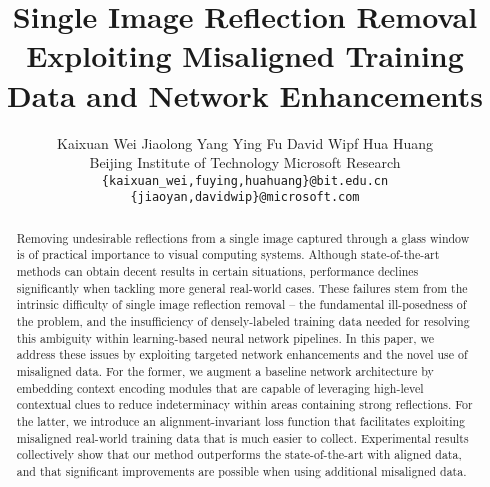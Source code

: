 \documentclass[10pt,twocolumn,letterpaper]{article}
\begin{document}
\title{Single Image Reflection Removal Exploiting Misaligned Training Data and Network Enhancements}

\author{Kaixuan Wei  \quad Jiaolong Yang \quad Ying Fu \quad David Wipf \quad Hua Huang
\\ Beijing Institute of Technology \quad Microsoft  Research\\
{\tt\small \{kaixuan\_wei,fuying,huahuang\}@bit.edu.cn} \quad
{\tt\small \{jiaoyan,davidwip\}@microsoft.com}
}



\maketitle


\begin{abstract}
Removing undesirable reflections from a single image captured through a glass window is of practical importance to visual computing systems. Although state-of-the-art methods can obtain decent results in certain situations, performance declines significantly when tackling more general real-world cases.  These failures stem from the intrinsic difficulty of single image reflection removal -- the fundamental ill-posedness of the problem, and the insufficiency of densely-labeled training data needed for resolving this ambiguity within learning-based neural network pipelines. In this paper, we address these issues by exploiting targeted network enhancements and the novel use of misaligned data. For the former, we augment a baseline network architecture by embedding context encoding modules that are capable of leveraging high-level contextual clues to reduce indeterminacy within areas containing strong reflections. For the latter, we introduce an alignment-invariant loss function that facilitates exploiting misaligned real-world training data that is much easier to collect.  Experimental results collectively show that our method outperforms the state-of-the-art with aligned data, and that significant improvements are possible when using additional misaligned data. 
\end{abstract}
\end{document}
